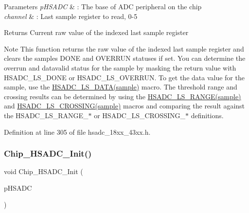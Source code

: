 \begin{DoxyParams}{Parameters}
{\em p\+H\+S\+A\+DC} & \+: The base of A\+DC peripheral on the chip \\
\hline
{\em channel} & \+: Last sample register to read, 0-\/5 \\
\hline
\end{DoxyParams}
\begin{DoxyReturn}{Returns}
Current raw value of the indexed last sample register 
\end{DoxyReturn}
\begin{DoxyNote}{Note}
This function returns the raw value of the indexed last sample register and clears the sample\textquotesingle{}s D\+O\+NE and O\+V\+E\+R\+R\+UN statuses if set. You can determine the overrun and datavalid status for the sample by masking the return value with H\+S\+A\+D\+C\+\_\+\+L\+S\+\_\+\+D\+O\+NE or H\+S\+A\+D\+C\+\_\+\+L\+S\+\_\+\+O\+V\+E\+R\+R\+UN. To get the data value for the sample, use the \hyperlink{group___h_s_a_d_c__18_x_x__43_x_x_ga59cfae9793b32fc984aa56b25e579e85}{H\+S\+A\+D\+C\+\_\+\+L\+S\+\_\+\+D\+A\+T\+A(sample)} macro. The threshold range and crossing results can be determined by using the \hyperlink{group___h_s_a_d_c__18_x_x__43_x_x_gab8577fad41f87c7822073b4b0e1b40c3}{H\+S\+A\+D\+C\+\_\+\+L\+S\+\_\+\+R\+A\+N\+G\+E(sample)} and \hyperlink{group___h_s_a_d_c__18_x_x__43_x_x_gabe3b261486872f47b15142374e8ba513}{H\+S\+A\+D\+C\+\_\+\+L\+S\+\_\+\+C\+R\+O\+S\+S\+I\+N\+G(sample)} macros and comparing the result against the H\+S\+A\+D\+C\+\_\+\+L\+S\+\_\+\+R\+A\+N\+G\+E\+\_\+$\ast$ or H\+S\+A\+D\+C\+\_\+\+L\+S\+\_\+\+C\+R\+O\+S\+S\+I\+N\+G\+\_\+$\ast$ definitions.~\newline
 
\end{DoxyNote}


Definition at line 305 of file hsadc\+\_\+18xx\+\_\+43xx.\+h.

\mbox{\label{group___h_s_a_d_c__18_x_x__43_x_x_gad72fb94bbb485c84687a4e75c63090ea}} 
\subsubsection{\texorpdfstring{Chip\+\_\+\+H\+S\+A\+D\+C\+\_\+\+Init()}{Chip\_HSADC\_Init()}}
{\footnotesize\ttfamily void Chip\+\_\+\+H\+S\+A\+D\+C\+\_\+\+Init (\begin{DoxyParamCaption}\item[{\hyperlink{struct_l_p_c___h_s_a_d_c___t}{L\+P\+C\+\_\+\+H\+S\+A\+D\+C\+\_\+T} $\ast$}]{p\+H\+S\+A\+DC }\end{DoxyParamCaption})}



